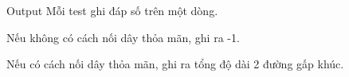 Output
Mỗi test ghi đáp số trên một dòng.

Nếu không có cách nối dây thỏa mãn, ghi ra -1.

Nếu có cách nối dây thỏa mãn, ghi ra tổng độ dài 2 đường gấp khúc.
